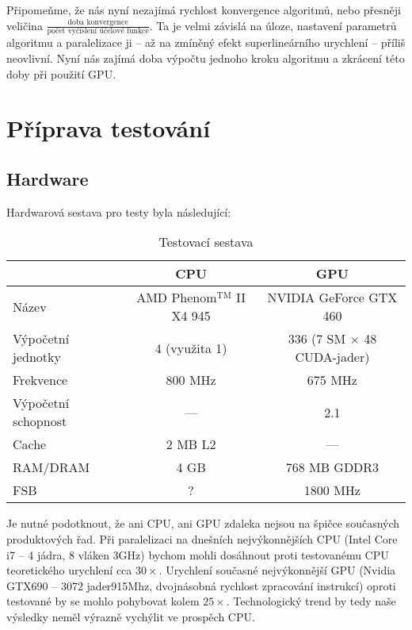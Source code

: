 
Připomeňme, že nás nyní nezajímá rychlost konvergence algoritmů, nebo přesněji veličina $\frac{\text{doba konvergence}}{\text{počet vyčíslení účelové funkce}}$. Ta je velmi závislá na úloze, nastavení parametrů algoritmu a paralelizace ji -- až na zmíněný efekt superlineárního urychlení -- příliš neovlivní. Nyní nás zajímá doba výpočtu jednoho kroku algoritmu a zkrácení této doby při použití GPU.

\section{Příprava testování}
\subsection{Hardware}

Hardwarová sestava pro testy byla následující:

\begin{table}[h]
    \begin{center}
    \begin{tabular}{lcc}
      \toprule
      & CPU & GPU \\
      \midrule
      Název & AMD Phenom$^\mathrm{TM}$ II X4 945 & NVIDIA GeForce GTX 460 \\
      Výpočetní jednotky & 4 (využita 1) & 336 (7 SM $\times$ 48 CUDA-jader) \\
      Frekvence & 800 MHz & 675 MHz \\
      Výpočetní schopnost & --- & 2.1 \\
      Cache & 2 MB L2 & --- \\
      RAM/DRAM & 4 GB & 768 MB GDDR3 \\
      FSB & ? & 1800 MHz \\
      \bottomrule
    \end{tabular}
    \caption{Testovací sestava}
    \end{center}
\end{table}

Je nutné podotknout, že ani CPU, ani GPU zdaleka nejsou na špičce současných produktových řad. Při paralelizaci na dnešních nejvýkonnějších CPU (Intel Core i7 -- 4 jádra, 8 vláken \@3GHz) bychom mohli dosáhnout proti testovanému CPU teoretického urychlení cca $30\times$. Urychlení současné nejvýkonnější GPU (Nvidia GTX690 -- 3072 jader\@915Mhz, dvojnásobná rychlost zpracování instrukcí) oproti testované by se mohlo pohybovat kolem $25\times$. Technologický trend by tedy naše výsledky neměl výrazně vychýlit ve prospěch CPU.

